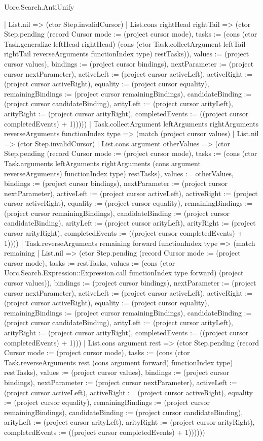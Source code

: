 \begin{lexlean}{Uorc.Search.AntiUnify}
\begin{semanticmodule}
{          | List.nil => (ctor Step.invalidCursor)
          | List.cons rightHead rightTail => (ctor Step.pending (record Cursor {mode := (project cursor mode), tasks := (cons (ctor Task.generalize leftHead rightHead) (cons (ctor Task.collectArgument leftTail rightTail reverseArguments functionIndex type) restTasks)), values := (project cursor values), bindings := (project cursor bindings), nextParameter := (project cursor nextParameter), activeLeft := (project cursor activeLeft), activeRight := (project cursor activeRight), equality := (project cursor equality), remainingBindings := (project cursor remainingBindings), candidateBinding := (project cursor candidateBinding), arityLeft := (project cursor arityLeft), arityRight := (project cursor arityRight), completedEvents := ((project cursor completedEvents) + 1)}))))
      | Task.collectArgument leftArguments rightArguments reverseArguments functionIndex type => (match (project cursor values)
        | List.nil => (ctor Step.invalidCursor)
        | List.cons argument otherValues => (ctor Step.pending (record Cursor {mode := (project cursor mode), tasks := (cons (ctor Task.arguments leftArguments rightArguments (cons argument reverseArguments) functionIndex type) restTasks), values := otherValues, bindings := (project cursor bindings), nextParameter := (project cursor nextParameter), activeLeft := (project cursor activeLeft), activeRight := (project cursor activeRight), equality := (project cursor equality), remainingBindings := (project cursor remainingBindings), candidateBinding := (project cursor candidateBinding), arityLeft := (project cursor arityLeft), arityRight := (project cursor arityRight), completedEvents := ((project cursor completedEvents) + 1)})))
      | Task.reverseArguments remaining forward functionIndex type => (match remaining
        | List.nil => (ctor Step.pending (record Cursor {mode := (project cursor mode), tasks := restTasks, values := (cons (ctor Uorc.Search.Expression::Expression.call functionIndex type forward) (project cursor values)), bindings := (project cursor bindings), nextParameter := (project cursor nextParameter), activeLeft := (project cursor activeLeft), activeRight := (project cursor activeRight), equality := (project cursor equality), remainingBindings := (project cursor remainingBindings), candidateBinding := (project cursor candidateBinding), arityLeft := (project cursor arityLeft), arityRight := (project cursor arityRight), completedEvents := ((project cursor completedEvents) + 1)}))
        | List.cons argument rest => (ctor Step.pending (record Cursor {mode := (project cursor mode), tasks := (cons (ctor Task.reverseArguments rest (cons argument forward) functionIndex type) restTasks), values := (project cursor values), bindings := (project cursor bindings), nextParameter := (project cursor nextParameter), activeLeft := (project cursor activeLeft), activeRight := (project cursor activeRight), equality := (project cursor equality), remainingBindings := (project cursor remainingBindings), candidateBinding := (project cursor candidateBinding), arityLeft := (project cursor arityLeft), arityRight := (project cursor arityRight), completedEvents := ((project cursor completedEvents) + 1)})))))
}


\end{semanticmodule}
\end{lexlean}
